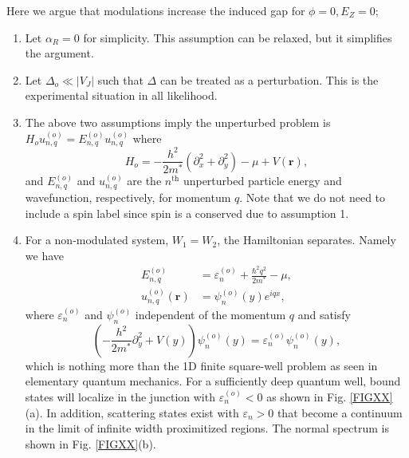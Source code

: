 \documentclass[twocolumn,aps,prb,nofootinbib]{revtex4-2}
\begin{document}
\iffalse
Here we argue that modulations increase the induced gap for $\phi = 0, E_Z = 0$;
\begin{enumerate}
    \item Let $\alpha_R = 0$ for simplicity. This assumption can be relaxed, but it simplifies the argument. 
    \item Let $\Delta_o \ll |V_J|$ such that $\Delta$ can be treated as a perturbation. This is the experimental situation in all likelihood.
    \item The above two assumptions imply the unperturbed problem is $H_o u_{n,q}^{(o)} = E_{n,q}^{(o)} u_{n,q}^{(o)}$ where 
    \begin{equation}
        H_o = 
        -\frac{h^2}{2 m^*}\left(\partial_x^2 + \partial_y^2\right)
    - \mu + V(\mathbf{r}),
    \end{equation}
    and $E_{n,q}^{(o)}$ and $u_{n,q}^{(o)}$ are the $n^\text{th}$ unperturbed particle energy and wavefunction, respectively, for momentum $q$. Note that we do not need to include a spin label since spin is a conserved due to assumption 1.
    \item For a non-modulated system, $W_1 = W_2$, the Hamiltonian separates. Namely we have 
    \begin{align}
        E_{n,q}^{(o)} &= 
        \varepsilon_n^{(o)} + \frac{\hbar^2 q^2}{2 m^*} - \mu, \\
         u_{n,q}^{(o)}(\mathbf{r}) &= 
         \psi_{n}^{(o)}(y) e^{i q x},
    \end{align}
    where $\varepsilon_n^{(o)}$ and $\psi_{n}^{(o)}$ independent of the momentum $q$ and satisfy
    \begin{equation}
        \left(
        -\frac{h^2}{2 m^*}\partial_y^2 + V(y)
        \right) \psi_{n}^{(o)}(y) = 
        \varepsilon_n^{(o)} \psi_{n}^{(o)}(y),
    \end{equation}
    which is nothing more than the 1D finite square-well problem as seen in elementary quantum mechanics. For a sufficiently deep quantum well, bound states will localize in the junction with $\varepsilon_n^{(o)} < 0$ as shown in Fig. \ref{FIGXX}(a). In addition, scattering states exist with $\varepsilon_n > 0$ that become a continuum in the limit of infinite width proximitized regions. The normal spectrum is shown in Fig. \ref{FIGXX}(b).

\end{enumerate}
\end{document}
